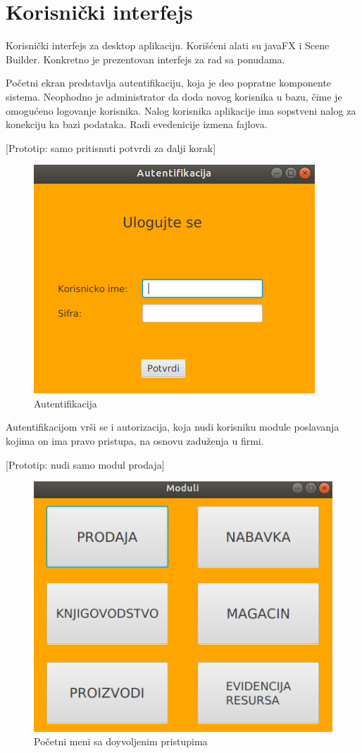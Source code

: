 \section{Korisnički interfejs}

Korisnički interfejs za desktop aplikaciju. Korišćeni alati su javaFX i Scene Builder. Konkretno je prezentovan interfejs za rad sa ponudama.

Početni ekran predstavlja autentifikaciju, koja je deo popratne komponente sistema. Neophodno je administrator da doda novog korisnika u bazu, čime je omogućeno logovanje korisnika. Nalog korisnika aplikacije ima sopstveni nalog za konekciju ka bazi podataka. Radi evedenicije izmena fajlova.

[Prototip: samo pritisnuti potvrdi za dalji korak]

\begin{figure}[ht]
\centering
\includegraphics{slike/UI-1.png}%
\caption{Autentifikacija}
\end{figure}

\clearpage

Autentifikacijom vrši se i autorizacija, koja nudi korisniku module poslavanja kojima on ima pravo pristupa, na osnovu zaduženja u firmi.

[Prototip: nudi samo modul prodaja]

\begin{figure}[ht]
\centering
\includegraphics{slike/UI-2.png}%
\caption{Početni meni sa doyvoljenim pristupima}
\end{figure}

